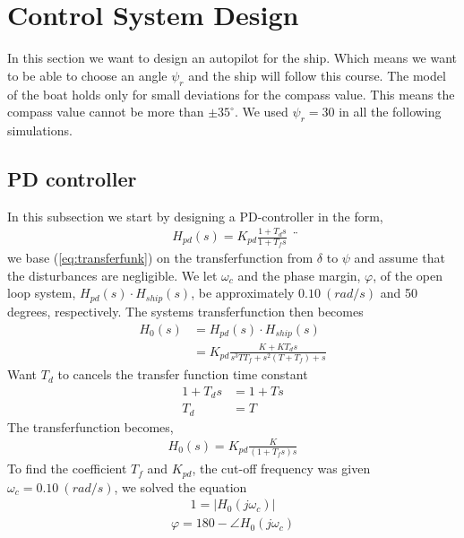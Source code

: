 \section{Control System Design} \label{sec:part3}
In this section we want to design an autopilot for the ship. Which means we want to be able to choose an angle $\psi_r$ and the ship will follow this course. The model of the boat holds only for small deviations for the compass value. This means the compass value cannot be more than $\pm 35^{\circ}$. We used $\psi_r = 30$ in all the following simulations. 

\subsection{PD controller}
In this subsection we start by designing a PD-controller in the form,
\begin{equation}
\begin{split}
   H_{pd}(s) = K_{pd} \frac{1+T_d s}{1+T_f s}
\end{split} ¨
\label{eq:transferfunk}
\end{equation}
we base (\ref{eq:transferfunk}) on the transferfunction from $\delta$ to $\psi$ and assume that the disturbances are negligible. We let $\omega_c$ and the phase margin, $\varphi$, of the open loop system, $H_{pd}(s) \cdot H_{ship}(s)$, be approximately $0.10 \  (rad/s)$ and 50 degrees, respectively. The systems transferfunction then becomes 
\begin{equation}
\begin{split}
    H_0(s) &= H_{pd}(s) \cdot H_{ship}(s) \\
    &= K_{pd} \frac{K + KT_d s}{s^3 T T_f +s^2(T + T_f) + s}
\end{split}
\end{equation}
\bigskip
Want $T_d$ to cancels the transfer function time constant
\begin{align*}
    1 + T_d s &= 1 + Ts \\
    T_d &= T
\end{align*}
The transferfunction becomes, 
\begin{equation}
\begin{split}
   H_{0}(s) = K_{pd} \frac{K}{(1+T_f s)s}
\end{split} 
\end{equation}
To find the coefficient $T_f$ and $K_{pd}$, the cut-off frequency was given $\omega_c = 0.10 \ (rad/s)$, we solved the equation 
\begin{equation}
    \begin{split}
        1 = |H_0(j\omega_{c})|
    \end{split}
\end{equation}
\begin{equation}
    \begin{split}
      \varphi = 180 - \angle H_0(j\omega_c)
    \end{split}
\end{equation}

